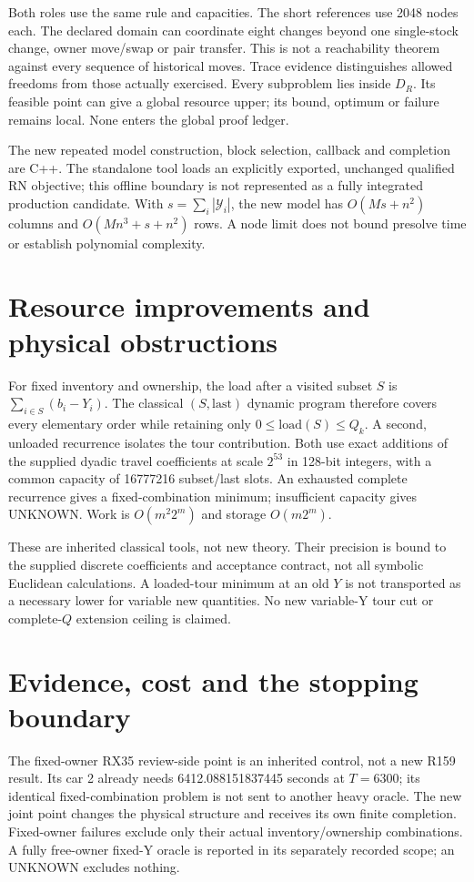 \documentclass[11pt]{article}
\begin{document}
Both roles use the same rule and capacities. The short references use 2048
nodes each. The declared domain can coordinate eight changes beyond one
single-stock change, owner move/swap or pair transfer. This is not a
reachability theorem against every sequence of historical moves. Trace
evidence distinguishes allowed freedoms from those actually exercised.
Every subproblem lies inside $D_R$. Its feasible point can give a global
resource upper; its bound, optimum or failure remains local. None enters
the global proof ledger.

The new repeated model construction, block selection, callback and completion
are C++. The standalone tool loads an explicitly exported, unchanged
qualified RN objective; this offline boundary is not represented as a
fully integrated production candidate. With $s=\sum_i|\mathcal Y_i|$, the
new model has $O(Ms+n^2)$ columns and $O(Mn^3+s+n^2)$ rows. A node limit
does not bound presolve time or establish polynomial complexity.

\section{Resource improvements and physical obstructions}


For fixed inventory and ownership, the load after a visited subset $S$ is
$\sum_{i\in S}(b_i-Y_i)$. The classical $(S,\mathrm{last})$ dynamic program
therefore covers every elementary order while retaining only
$0\le\mathrm{load}(S)\le Q_k$. A second, unloaded recurrence isolates the
tour contribution. Both use exact additions of the supplied dyadic travel
coefficients at scale $2^{53}$ in 128-bit integers, with a common capacity
of 16777216 subset/last slots. An exhausted complete recurrence gives a
fixed-combination minimum; insufficient capacity gives UNKNOWN.
Work is $O(m^2 2^m)$ and storage $O(m2^m)$.

These are inherited classical tools, not new theory. Their precision is
bound to the supplied discrete coefficients and acceptance contract, not
all symbolic Euclidean calculations. A loaded-tour minimum at an old $Y$
is not transported as a necessary lower for variable new quantities. No
new variable-Y tour cut or complete-$Q$ extension ceiling is claimed.

\section{Evidence, cost and the stopping boundary}
The fixed-owner RX35 review-side point is an inherited control, not a new
R159 result. Its car 2 already needs 6412.088151837445 seconds at $T=6300$;
its identical fixed-combination problem is not sent to another heavy oracle.
The new joint point changes the physical structure and receives its own
finite completion. Fixed-owner failures exclude only their actual
inventory/ownership combinations. A fully free-owner fixed-Y oracle is
reported in its separately recorded scope; an UNKNOWN excludes nothing.
\end{document}
